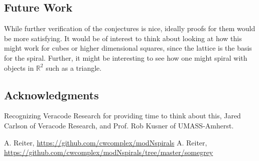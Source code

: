 \documentclass[11pt]{amsart}
\theoremstyle{mydef}
\begin{document}
\subsection{Future Work}
While further verification of the conjectures is nice, ideally proofs for them would be more satisfying.
It would be of interest to think about looking at how this might work for cubes or higher dimensional squares, since the lattice is the basis for the spiral. Further, it might be interesting to see how one might spiral with objects in $\mathbb{R}^2$ such as a triangle.
\subsection{Acknowledgments}
Recognizing Veracode Research for providing time to think about this, Jared Carlson of Veracode Research, and Prof. Rob Kusner of UMASS-Amherst.

\begin{thebibliography}{1}
 A. Reiter, \url{https://github.com/cwcomplex/modNspirals}
 A. Reiter, \url{https://github.com/cwcomplex/modNspirals/tree/master/somegrey}

\end{thebibliography}
\end{document}
